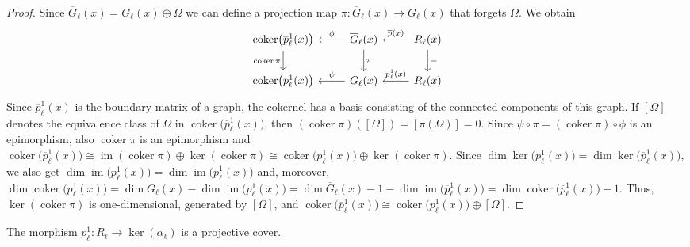 \documentclass[english,a4paper,nolineno,cleveref]{socg-lipics-v2021}
\DeclareMathOperator{\im}{im}
\DeclareMathOperator{\coker}{coker}
\begin{document}
\begin{proof}
Since $\overline{G}_\ell(x)=G_\ell(x)\oplus \Omega$ we can define a projection map $\pi\colon \overline{G}_\ell(x)\rightarrow G_\ell(x)$ that forgets $\Omega$. We obtain
\begin{equation*}
\begin{tikzcd}
\coker\!\big(\overline{p}^1_\ell(x)\big) \arrow[d,swap,"\coker \pi"] & \overline{G}_\ell(x) \arrow[l,swap,"\phi"] \arrow[d,"\pi"] & R_\ell(x) \arrow[l,swap,"\overline{p}(x)"] \arrow[d,"="] \\
\coker\!\big(p^1_\ell(x)\big) & G_\ell(x) \arrow[l,swap,"\psi"] & R_\ell(x) \arrow[l,swap,"p^1_\ell(x)"]
\end{tikzcd}
\end{equation*}
Since $\overline{p}^1_\ell(x)$ is the boundary matrix of a graph, the cokernel has a basis consisting of the connected components of this graph. If $[\Omega]$ denotes the equivalence class of $\Omega$ in $\coker \!\big(\overline{p}^1_\ell(x)\big)$, then  $(\coker \pi)([\Omega])=[\pi(\Omega)]=0$. Since $\psi\circ \pi=(\coker \pi)\circ \phi$ is an epimorphism, also $\coker \pi$ is an epimorphism and $\coker\!\big(\overline{p}^1_\ell(x)\big)\cong \im(\coker \pi)\oplus \ker(\coker \pi)\cong \coker\!\big(p^1_\ell(x)\big) \oplus \ker(\coker \pi)$. Since $\dim\ker\!\big(p^1_\ell(x)\big)=\dim\ker\!\big(\overline{p}^1_\ell(x)\big)$, we also get $\dim \im\!\big( p^1_\ell(x)\big)=\dim \im \!\big(\overline{p}^1_\ell(x)\big)$ and, moreover, $\dim \coker \!\big(p^1_\ell(x)\big)=\dim G_\ell(x)-\dim \im \!\big(p^1_\ell(x)\big)=\dim \overline{G}_\ell(x)-1-\dim \im \!\big(\overline{p}^1_\ell(x)\big)=\dim \coker\!\big( \overline{p}^1_\ell(x)\big)-1$. Thus, $\ker(\coker \pi)$ is one-dimensional, generated by $[\Omega]$, and $\coker\!\big( \overline{p}^1_\ell(x)\big)\cong \coker\!\big( p^1_\ell(x)\big) \oplus [\Omega]$.
\end{proof}


\begin{proposition} \label{prop:p1_proj_cover}
The morphism $p_\ell^1\colon R_\ell\rightarrow \ker(\alpha_\ell)$ is a projective cover.
\end{proposition}
\end{document}
